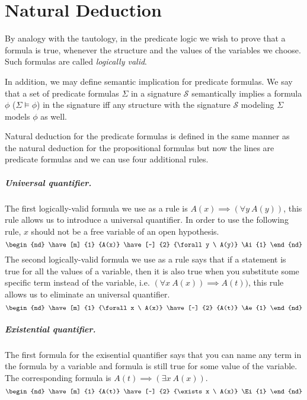 \chapter{Natural Deduction}
By analogy with the tautology, in the predicate logic we wish to prove that a
formula is true, whenever the structure and the values of the variables we
choose. Such formulas are called \textit{logically valid}.

In addition, we may define semantic implication for predicate formulas.
We say that a set of predicate formulas $\Sigma$ in a signature $\mathcal{S}$
semantically implies a formula $\phi$ ($\Sigma \models \phi$) in the signature
iff any structure with the signature $\mathcal{S}$ modeling $\Sigma$ models
$\phi$ as well.

Natural deduction for the predicate formulas is defined in the same manner as
the natural deduction for the propositional formulas but now the lines are
predicate formulas and we can use four additional rules.

\paragraph{Universal quantifier.}
The first logically-valid formula we use as a rule is
$A(x) \implies (\forall y \ A(y))$,
this rule allows us to introduce a universal quantifier.
In order to use the following rule, $x$ should not be a free variable of
an open hypothesis.
\[
  \begin{nd}
    \have [m] {1} {A(x)}
    \have [~] {2} {\forall y \  A(y)} \Ai{1}
  \end{nd}
\]
The second logically-valid formula we use as a rule says that if a statement is
true for all the values of a variable, then it is also true when you substitute
some specific term instead of the variable, i.e. $(\forall x \ A(x)) \implies
A(t))$, this rule allows us to eliminate an universal quantifier.
\[
  \begin{nd}
    \have [m] {1} {\forall x \  A(x)}
    \have [~] {2} {A(t)} \Ae{1}
  \end{nd}
\]

\paragraph{Existential quantifier.}
The first formula for the exisential quantifier says that you can name any term
in the formula by a variable and formula is still true for some value of the
variable. The corresponding formula is $A(t) \implies (\exists x \ A(x))$.
\[
  \begin{nd}
    \have [m] {1} {A(t)}
    \have [~] {2} {\exists x \ A(x)} \Ei{1}
  \end{nd}
\]

